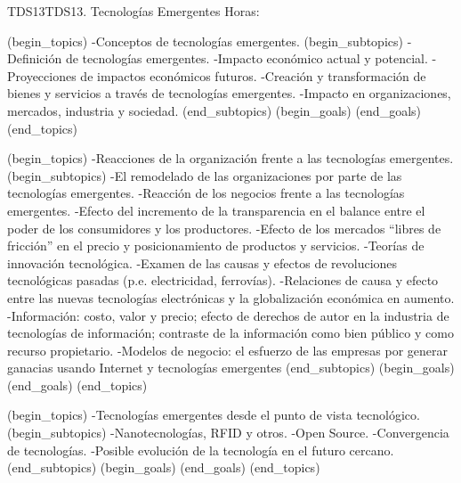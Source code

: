 \begin{BKL2}{TDS13}{TDS13. Tecnologías Emergentes}
Horas:
 
(begin_topics)
-Conceptos de tecnologías emergentes.
(begin_subtopics)
-Definición de tecnologías emergentes.
-Impacto económico actual y potencial.
-Proyecciones de impactos económicos futuros.
-Creación y transformación de bienes y servicios a través de tecnologías emergentes.
-Impacto en organizaciones, mercados, industria y sociedad.
(end_subtopics)
(begin_goals)
(end_goals)
(end_topics)

(begin_topics)
-Reacciones de la organización frente a las tecnologías emergentes.
(begin_subtopics)
-El remodelado de las organizaciones por parte de las tecnologías emergentes.
-Reacción de los negocios frente a las tecnologías emergentes.
-Efecto del incremento de la transparencia en el balance entre el poder de los consumidores y los productores.
-Efecto de los mercados ``libres de fricción'' en el precio y posicionamiento de productos y servicios.
-Teorías de innovación tecnológica.
-Examen de las causas y efectos de revoluciones tecnológicas pasadas (p.e. electricidad, ferrovías).
-Relaciones de causa y efecto entre las nuevas tecnologías electrónicas y la globalización económica en aumento.
-Información: costo, valor y precio; efecto de derechos de autor en la industria de tecnologías de información; contraste de la información como bien público y como recurso propietario.
-Modelos de negocio: el esfuerzo de las empresas por generar ganacias usando Internet y tecnologías emergentes 
(end_subtopics)
(begin_goals)
(end_goals)
(end_topics)

(begin_topics)
-Tecnologías emergentes desde el punto de vista tecnológico.
(begin_subtopics)
-Nanotecnologías, RFID y otros.
-Open Source.
-Convergencia de tecnologías.
-Posible evolución de la tecnología en el futuro cercano.
(end_subtopics)
(begin_goals)
(end_goals)
(end_topics)


\end{BKL2}
